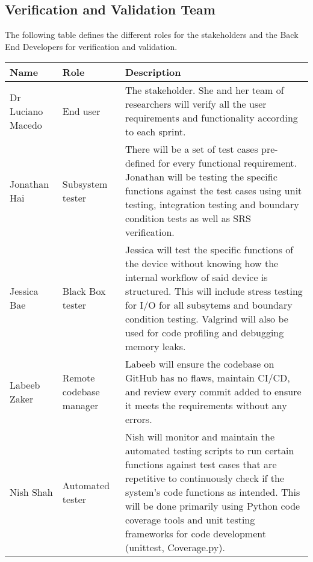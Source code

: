 \documentclass[12pt, titlepage]{article}
\begin{document}
\subsection{Verification and Validation Team}

The following table defines the different roles for the stakeholders and the Back End Developers for verification and validation.
\begin{center}
  \begin{tabular}{|m{5em}|m{5em}|m{25em}|}

    \hline
    \label{4_1}\textbf{Name} & \textbf{Role}                 & \textbf{Description}                                                                                                                                                                                                                                                \\
    \hline
    Dr Luciano Macedo        & End user                      & The stakeholder. She and her team of researchers will verify all the user requirements and functionality according to each sprint.                                                                                                                                                       \\
    \hline
    Jonathan Hai            & Subsystem tester              & There will be a set of test cases pre-defined for every functional requirement. Jonathan will be testing the specific functions against the test cases using unit testing, integration testing and boundary condition tests as well as SRS verification.            \\
    \hline
    Jessica Bae              & Black Box tester              & Jessica will test the specific functions of the device without knowing how the internal workflow of said device is structured. This will include stress testing for I/O for all subsytems and boundary condition testing. Valgrind will also be used for code profiling and debugging memory leaks.        \\
    \hline
    Labeeb Zaker             & Remote codebase manager       & Labeeb will ensure the codebase on GitHub has no flaws, maintain CI/CD, and review every commit added to ensure it meets the requirements without any errors.                                                                                              \\
    \hline
    Nish Shah                & Automated tester              & Nish will monitor and maintain the automated testing scripts to run certain functions against test cases that are repetitive to continuously check if the system's code functions as intended. This will be done primarily using Python code coverage tools and unit testing frameworks for code development (unittest, Coverage.py). \\

\end{tabular}
\end{center}
\end{document}
